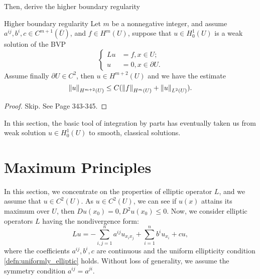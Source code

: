 Then, derive the higher boundary regularity
\begin{theorem}{Higher boundary regularity}
    Let $m$ be a nonnegative integer, and assume $a^{ij},b^{i},c\in C^{m+1}(\bar{U})$, and $f\in H^{m}(U)$, suppose that $u\in H_{0}^{1}(U)$ is a weak solution of the BVP
    \begin{equation}
        \left\{
            \begin{aligned}
                Lu&=f,x\in U;\\
                u&=0,x\in\partial U.
            \end{aligned}
        \right.
    \end{equation}
    Assume finally $\partial U\in C^2$, then $u\in H^{m+2}(U)$ and we have the estimate
    \begin{equation}
        \left\|u\right\|_{H^{m+2}(U)}\le C(\left\|f\right\|_{H^{m}(U)}+\left\|u\right\|_{L^{2}(U)}).
    \end{equation}
\end{theorem}
\begin{proof}
    Skip. See \cite{evans2022partial} Page 343-345.
\end{proof}

In this section, the basic tool of integration by parts has eventually taken us from weak solution $u\in H_{0}^{1}(U)$ to smooth, classical solutions.
\section{Maximum Principles}
In this section, we concentrate on the properties of elliptic operator $L$, and we assume that $u\in C^{2}(U)$. As $u\in C^{2}(U)$, we can see if $u(x)$ attains its maximum over $U$, then $Du(x_{0})=0,D^{2}u(x_{0})\le 0$. Now, we consider elliptic operators $L$ having the nondivergence form:
\begin{equation}
    \label{eq:div_form}
    Lu=-\sum_{i,j=1}^{n}a^{ij}u_{x_{i}x_{j}}+\sum_{i=1}^{n}b^{i}u_{x_{i}}+cu,
\end{equation}
where the coefficients $a^{ij},b^{i},c$ are continuous and the uniform ellipticity condition \ref{defn:uniformly_elliptic} holds. Without loss of generality, we assume the symmetry condition $a^{ij}=a^{ji}$.
